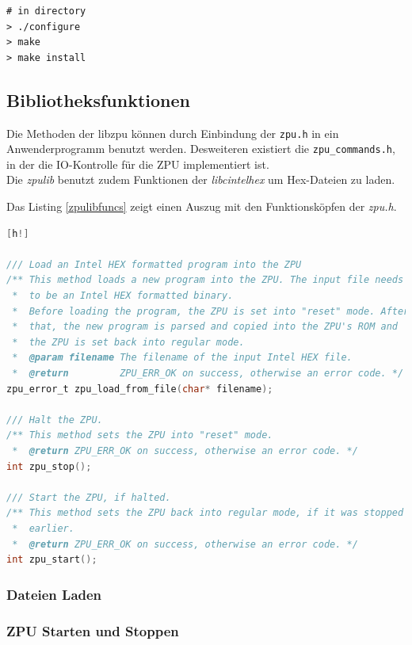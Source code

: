 \documentclass[11pt]{scrartcl}
\begin{document}
\begin{lstlisting}[caption=Installation der zpulib-Bibliothek]
# in directory
> ./configure
> make
> make install
\end{lstlisting}
 
\subsection{Bibliotheksfunktionen}
Die Methoden der libzpu können durch Einbindung der \texttt{zpu.h} in ein Anwenderprogramm benutzt werden. Desweiteren existiert die \texttt{zpu\_commands.h}, in der die IO-Kontrolle für die ZPU implementiert ist. \\
Die \textit{zpulib} benutzt zudem Funktionen der \textit{libcintelhex} um Hex-Dateien zu laden.

Das Listing \ref{zpulibfuncs} zeigt einen Auszug mit den Funktionsköpfen der \textit{zpu.h}.

\begin{lstlisting}[language=C, firstnumber=44, label=zpulibfuncs, caption=zpulib-Bibliotheksfunktionen][h!]

/// Load an Intel HEX formatted program into the ZPU
/** This method loads a new program into the ZPU. The input file needs
 *  to be an Intel HEX formatted binary.
 *  Before loading the program, the ZPU is set into "reset" mode. After
 *  that, the new program is parsed and copied into the ZPU's ROM and
 *  the ZPU is set back into regular mode.
 *  @param filename The filename of the input Intel HEX file.
 *  @return         ZPU_ERR_OK on success, otherwise an error code. */
zpu_error_t zpu_load_from_file(char* filename);

/// Halt the ZPU.
/** This method sets the ZPU into "reset" mode.
 *  @return ZPU_ERR_OK on success, otherwise an error code. */
int zpu_stop();

/// Start the ZPU, if halted.
/** This method sets the ZPU back into regular mode, if it was stopped
 *  earlier. 
 *  @return ZPU_ERR_OK on success, otherwise an error code. */
int zpu_start();

\end{lstlisting}

\subsubsection{Dateien Laden}

\subsubsection{ZPU Starten und Stoppen}
\end{document}
